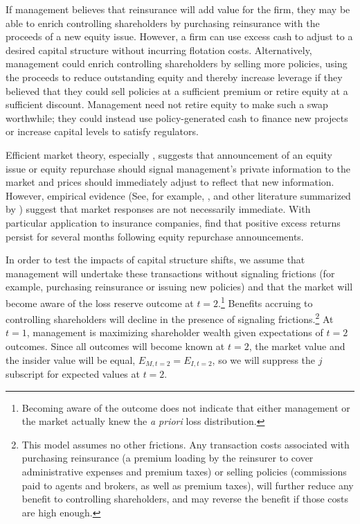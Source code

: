 If management believes that reinsurance will add value for the firm, they may be able to enrich controlling shareholders by purchasing reinsurance with the proceeds of a new equity issue.  However, a firm can use excess cash to adjust to a desired capital structure without incurring flotation costs. Alternatively, management could enrich controlling shareholders by selling more policies, using the proceeds to reduce outstanding equity and thereby increase leverage if they believed that they could sell policies at a sufficient premium or retire equity at a sufficient discount.  Management need not retire equity to make such a swap worthwhile; they could instead use policy-generated cash to finance new projects or increase capital levels to satisfy regulators.

Efficient market theory, especially \citet{ross1977a}, suggests that  announcement of an equity issue or equity repurchase should signal management's private information to the market and prices should immediately adjust to reflect that new information.  However, empirical evidence (See, for example, \citet{lakonishok1990a,ikenberry1995a,loughran1995a,speiss1995a}, and other literature summarized by \citet{klein2002a}) suggest that market responses are not necessarily immediate.  With particular application to insurance companies, \citet{miller2005a} find that positive excess returns persist for several months following equity repurchase announcements. 

In order to test the impacts of capital structure shifts, we assume that management will undertake these transactions without signaling frictions (for example, purchasing reinsurance or issuing new policies) and that the market will become aware of the loss reserve outcome at $t=2$.\footnote{Becoming aware of the outcome does not indicate that either management or the market actually knew the \textit{a priori} loss distribution.}  Benefits accruing to controlling shareholders will decline in the presence of signaling frictions.\footnote{This model assumes no other frictions.  Any transaction costs associated with purchasing reinsurance (a premium loading by the reinsurer to cover administrative expenses and premium taxes) or selling policies (commissions paid to agents and brokers, as well as premium taxes), will further reduce any benefit to controlling shareholders, and may reverse the benefit if those costs are high enough.} At $t=1$, management is maximizing shareholder wealth given expectations of $t=2$ outcomes.  Since all outcomes will become known at $t=2$, the market value and the insider value will be  equal, $E_{M, t=2}=E_{I, t=2}$, so we will suppress the $j$ subscript for expected values at $t=2$.


